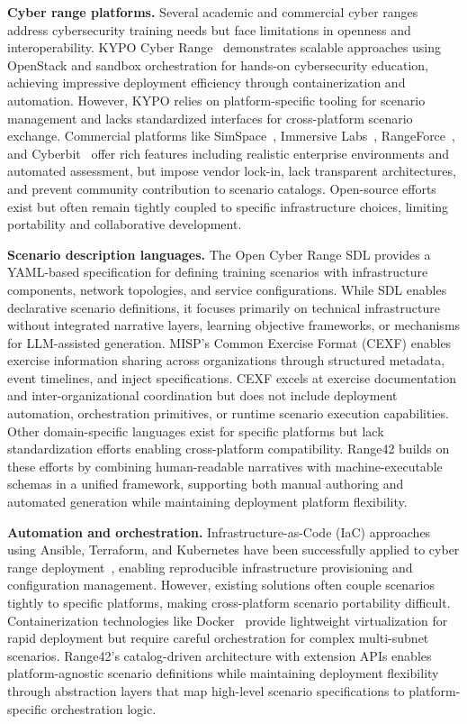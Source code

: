 \documentclass[11pt]{article}
\begin{document}
\textbf{Cyber range platforms.}
Several academic and commercial cyber ranges address cybersecurity training needs but face limitations in openness and interoperability.
KYPO Cyber Range~\cite{kypo2020} demonstrates scalable approaches using OpenStack and sandbox orchestration for hands-on cybersecurity education, achieving impressive deployment efficiency through containerization and automation. However, KYPO relies on platform-specific tooling for scenario management and lacks standardized interfaces for cross-platform scenario exchange.
Commercial platforms like SimSpace~\cite{simspace}, Immersive Labs~\cite{immersive}, RangeForce~\cite{rangeforce}, and Cyberbit~\cite{cyberbit} offer rich features including realistic enterprise environments and automated assessment, but impose vendor lock-in, lack transparent architectures, and prevent community contribution to scenario catalogs.
Open-source efforts exist but often remain tightly coupled to specific infrastructure choices, limiting portability and collaborative development.

\textbf{Scenario description languages.}
The Open Cyber Range SDL provides a YAML-based specification for defining training scenarios with infrastructure components, network topologies, and service configurations. While SDL enables declarative scenario definitions, it focuses primarily on technical infrastructure without integrated narrative layers, learning objective frameworks, or mechanisms for LLM-assisted generation.
MISP's Common Exercise Format (CEXF) enables exercise information sharing across organizations through structured metadata, event timelines, and inject specifications. CEXF excels at exercise documentation and inter-organizational coordination but does not include deployment automation, orchestration primitives, or runtime scenario execution capabilities.
Other domain-specific languages exist for specific platforms but lack standardization efforts enabling cross-platform compatibility.
Range42 builds on these efforts by combining human-readable narratives with machine-executable schemas in a unified framework, supporting both manual authoring and automated generation while maintaining deployment platform flexibility.

\textbf{Automation and orchestration.}
Infrastructure-as-Code (IaC) approaches using Ansible, Terraform, and Kubernetes have been successfully applied to cyber range deployment~\cite{kypo2020}, enabling reproducible infrastructure provisioning and configuration management.
However, existing solutions often couple scenarios tightly to specific platforms, making cross-platform scenario portability difficult.
Containerization technologies like Docker~\cite{docker} provide lightweight virtualization for rapid deployment but require careful orchestration for complex multi-subnet scenarios.
Range42's catalog-driven architecture with extension APIs enables platform-agnostic scenario definitions while maintaining deployment flexibility through abstraction layers that map high-level scenario specifications to platform-specific orchestration logic.
\end{document}
